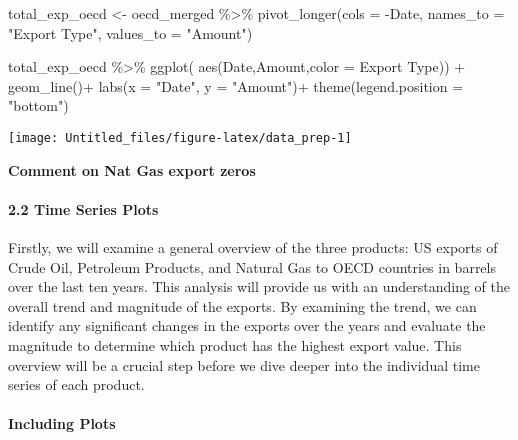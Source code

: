\documentclass[
]{article}
\newenvironment{Shaded}{\begin{snugshade}}{\end{snugshade}}
\newcommand{\AttributeTok}[1]{\textcolor[rgb]{0.77,0.63,0.00}{#1}}
\newcommand{\FunctionTok}[1]{\textcolor[rgb]{0.00,0.00,0.00}{#1}}
\newcommand{\NormalTok}[1]{#1}
\newcommand{\OtherTok}[1]{\textcolor[rgb]{0.56,0.35,0.01}{#1}}
\newcommand{\SpecialCharTok}[1]{\textcolor[rgb]{0.00,0.00,0.00}{#1}}
\newcommand{\StringTok}[1]{\textcolor[rgb]{0.31,0.60,0.02}{#1}}
\begin{document}
\begin{Shaded}
\begin{Highlighting}[]
\NormalTok{total\_exp\_oecd }\OtherTok{\textless{}{-}}\NormalTok{ oecd\_merged }\SpecialCharTok{\%\textgreater{}\%}
  \FunctionTok{pivot\_longer}\NormalTok{(}\AttributeTok{cols =} \SpecialCharTok{{-}}\NormalTok{Date, }\AttributeTok{names\_to =} \StringTok{"Export Type"}\NormalTok{, }\AttributeTok{values\_to =} \StringTok{"Amount"}\NormalTok{)}


\NormalTok{total\_exp\_oecd }\SpecialCharTok{\%\textgreater{}\%} \FunctionTok{ggplot}\NormalTok{(}
 \FunctionTok{aes}\NormalTok{(Date,Amount,}\AttributeTok{color =} \StringTok{\textasciigrave{}}\AttributeTok{Export Type}\StringTok{\textasciigrave{}}\NormalTok{)) }\SpecialCharTok{+}
   \FunctionTok{geom\_line}\NormalTok{()}\SpecialCharTok{+}
   \FunctionTok{labs}\NormalTok{(}\AttributeTok{x =} \StringTok{"Date"}\NormalTok{, }\AttributeTok{y =} \StringTok{"Amount"}\NormalTok{)}\SpecialCharTok{+}
  \FunctionTok{theme}\NormalTok{(}\AttributeTok{legend.position =} \StringTok{"bottom"}\NormalTok{)}
\end{Highlighting}
\end{Shaded}

\begin{center}\texttt{[image: Untitled\_files/figure-latex/data\_prep-1]} \end{center}

\textbf{Comment on Nat Gas export zeros}

\hypertarget{time-series-plots}{%
\paragraph{2.2 Time Series Plots}\label{time-series-plots}}

Firstly, we will examine a general overview of the three products: US
exports of Crude Oil, Petroleum Products, and Natural Gas to OECD
countries in barrels over the last ten years. This analysis will provide
us with an understanding of the overall trend and magnitude of the
exports. By examining the trend, we can identify any significant changes
in the exports over the years and evaluate the magnitude to determine
which product has the highest export value. This overview will be a
crucial step before we dive deeper into the individual time series of
each product.

\hypertarget{including-plots}{%
\paragraph{Including Plots}\label{including-plots}}
\end{document}
